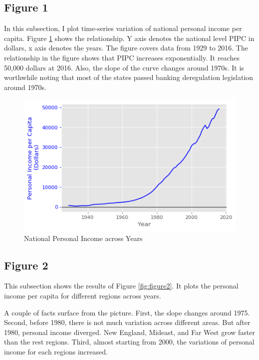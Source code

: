 \documentclass[letterpaper,12pt]{article}
\theoremstyle{definition}
\begin{document}
\subsection{Figure 1}

In this subsection, I plot time-series variation of national personal income per capita. Figure \ref{fig:figure1} shows the relationship. Y axis denotes the national level PIPC in dollars, x axis denotes the years. The figure covers data from 1929 to 2016. The relationship in the figure shows that PIPC increases exponentially. It reaches 50,000 dollars at 2016. Also, the slope of the curve changes around 1970s. It is worthwhile noting that most of the states passed banking deregulation legislation around 1970s.


\begin{figure}[h]
	\centering
	\includegraphics[width=\textwidth]{figure1}
	\caption{National Personal Income across Years}
	\label{fig:figure1}
\end{figure}



\subsection{Figure 2}

This subsection shows the results of Figure \ref{fig:figure2}. It plots the personal income per capita for different regions across years. 

A couple of facts surface from the picture. First, the slope changes around 1975. Second, before 1980, there is not much variation across different areas. But after 1980, personal income diverged. New England, Mideast, and Far West grow faster than the rest regions. Third, almost starting from 2000, the variations of personal income for each regions increased.
\end{document}
